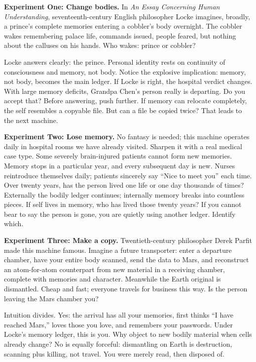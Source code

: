 \textbf{Experiment One: Change bodies.} In \textit{An Essay Concerning Human Understanding}, seventeenth-century English philosopher Locke imagines, broadly, a prince's complete memories entering a cobbler's body overnight. The cobbler wakes remembering palace life, commands issued, people feared, but nothing about the calluses on his hands. Who wakes: prince or cobbler?

Locke answers clearly: the prince. Personal identity rests on continuity of consciousness and memory, not body. Notice the explosive implication: memory, not body, becomes the main ledger. If Locke is right, the hospital verdict changes. With large memory deficits, Grandpa Chen's person really is departing. Do you accept that? Before answering, push further. If memory can relocate completely, the self resembles a copyable file. But can a file be copied twice? That leads to the next machine.

\textbf{Experiment Two: Lose memory.} No fantasy is needed; this machine operates daily in hospital rooms we have already visited. Sharpen it with a real medical case type. Some severely brain-injured patients cannot form new memories. Memory stops in a particular year, and every subsequent day is new. Nurses reintroduce themselves daily; patients sincerely say ``Nice to meet you'' each time. Over twenty years, has the person lived one life or one day thousands of times? Externally the bodily ledger continues; internally memory breaks into countless pieces. If self lives in memory, who has lived those twenty years? If you cannot bear to say the person is gone, you are quietly using another ledger. Identify which.

\textbf{Experiment Three: Make a copy.} Twentieth-century philosopher Derek Parfit made this machine famous. Imagine a future transporter: enter a departure chamber, have your entire body scanned, send the data to Mars, and reconstruct an atom-for-atom counterpart from new material in a receiving chamber, complete with memories and character. Meanwhile the Earth original is dismantled. Cheap and fast; everyone travels for business this way. Is the person leaving the Mars chamber you?

Intuition divides. Yes: the arrival has all your memories, first thinks ``I have reached Mars,'' loves those you love, and remembers your passwords. Under Locke's memory ledger, this is you. Why object to new bodily material when cells already change? No is equally forceful: dismantling on Earth is destruction, scanning plus killing, not travel. You were merely read, then disposed of.

